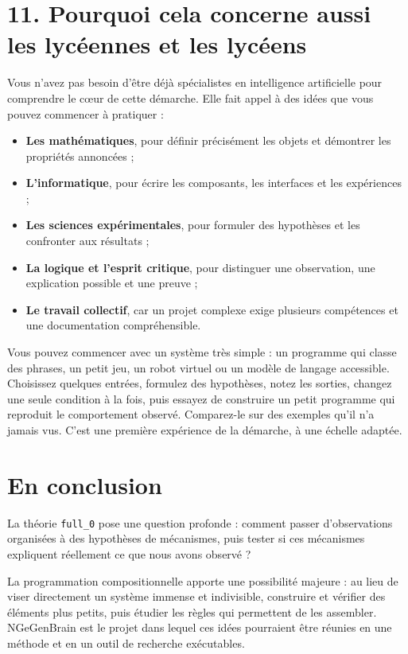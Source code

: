 \documentclass[11pt,a4paper]{article}
\begin{document}
\section*{11. Pourquoi cela concerne aussi les lycéennes et les lycéens}

Vous n'avez pas besoin d'être déjà spécialistes en intelligence artificielle pour comprendre le cœur de cette démarche. Elle fait appel à des idées que vous pouvez commencer à pratiquer :
\begin{itemize}[leftmargin=1.4em]
  \item \textbf{Les mathématiques}, pour définir précisément les objets et démontrer les propriétés annoncées ;
  \item \textbf{L'informatique}, pour écrire les composants, les interfaces et les expériences ;
  \item \textbf{Les sciences expérimentales}, pour formuler des hypothèses et les confronter aux résultats ;
  \item \textbf{La logique et l'esprit critique}, pour distinguer une observation, une explication possible et une preuve ;
  \item \textbf{Le travail collectif}, car un projet complexe exige plusieurs compétences et une documentation compréhensible.
\end{itemize}

Vous pouvez commencer avec un système très simple : un programme qui classe des phrases, un petit jeu, un robot virtuel ou un modèle de langage accessible. Choisissez quelques entrées, formulez des hypothèses, notez les sorties, changez une seule condition à la fois, puis essayez de construire un petit programme qui reproduit le comportement observé. Comparez-le sur des exemples qu'il n'a jamais vus. C'est une première expérience de la démarche, à une échelle adaptée.

\section*{En conclusion}

La théorie \texttt{full\_0} pose une question profonde : comment passer d'observations organisées à des hypothèses de mécanismes, puis tester si ces mécanismes expliquent réellement ce que nous avons observé ?

La programmation compositionnelle apporte une possibilité majeure : au lieu de viser directement un système immense et indivisible, construire et vérifier des éléments plus petits, puis étudier les règles qui permettent de les assembler. NGeGenBrain est le projet dans lequel ces idées pourraient être réunies en une méthode et en un outil de recherche exécutables.
\end{document}
